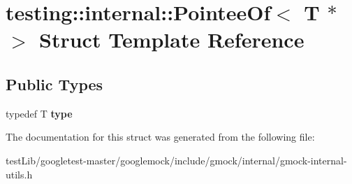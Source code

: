 \hypertarget{structtesting_1_1internal_1_1PointeeOf_3_01T_01_5_01_4}{}\section{testing\+:\+:internal\+:\+:Pointee\+Of$<$ T $\ast$ $>$ Struct Template Reference}
\label{structtesting_1_1internal_1_1PointeeOf_3_01T_01_5_01_4}
\subsection*{Public Types}
\begin{DoxyCompactItemize}
\item 
\mbox{\label{structtesting_1_1internal_1_1PointeeOf_3_01T_01_5_01_4_a91dde514cd3a8c07cedbe5336c36a55f}} 
typedef T {\bfseries type}
\end{DoxyCompactItemize}


The documentation for this struct was generated from the following file\+:\begin{DoxyCompactItemize}
\item 
test\+Lib/googletest-\/master/googlemock/include/gmock/internal/gmock-\/internal-\/utils.\+h\end{DoxyCompactItemize}
